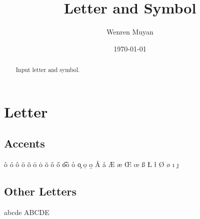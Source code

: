 \documentclass{article}
\title{Letter and Symbol}
\author{Wenren Muyan}
\date{\today}
\begin{document}
    \maketitle

    \begin{abstract}
        Input letter and symbol. 
    \end{abstract}

    \tableofcontents

    \section{Letter}
        \subsection{Accents}
            \`o \phantom{50} \'o \phantom{50} \^o \phantom{50} \"o \newline
            \~o \phantom{50} \=o \phantom{50} \.o\phantom{50} \u{o} \newline
            \v{o} \phantom{50} \H{o} \phantom{50} \t{oo} \phantom{50} \r{o}\newline
            \c{o} \phantom{50} \d{o} \phantom{50} \b{o}\newline
            \AA \phantom{50} \aa \phantom{50} \AE \phantom{50} \ae\newline
            \OE \phantom{50} \oe \phantom{50} \SS \phantom{50} \ss\newline
            \IJ \phantom{50} \ij \phantom{50} \L \phantom{50} \l\newline
            \O \phantom{50} \o \phantom{50} \i \phantom{50} \j

        \subsection{Other Letters}
            \textgreek{abcde}\newline                   %
            {\selectfont ABCDE}       %
\end{document}
